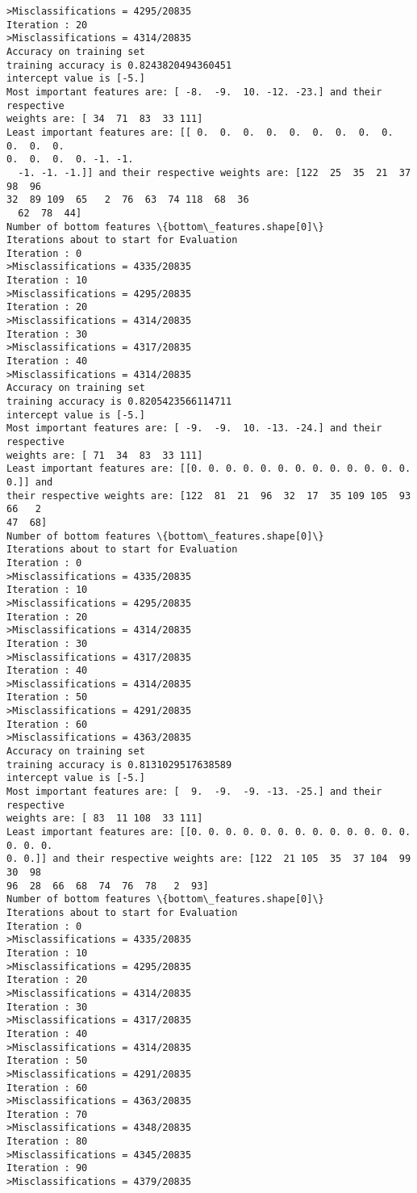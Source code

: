 \documentclass[11pt]{article}
\begin{document}
\begin{Verbatim}[commandchars=\\\{\}]
>Misclassifications = 4295/20835
Iteration : 20
>Misclassifications = 4314/20835
Accuracy on training set
training accuracy is 0.8243820494360451
intercept value is [-5.]
Most important features are: [ -8.  -9.  10. -12. -23.] and their respective
weights are: [ 34  71  83  33 111]
Least important features are: [[ 0.  0.  0.  0.  0.  0.  0.  0.  0.  0.  0.  0.
0.  0.  0.  0. -1. -1.
  -1. -1. -1.]] and their respective weights are: [122  25  35  21  37  98  96
32  89 109  65   2  76  63  74 118  68  36
  62  78  44]
Number of bottom features \{bottom\_features.shape[0]\}
Iterations about to start for Evaluation
Iteration : 0
>Misclassifications = 4335/20835
Iteration : 10
>Misclassifications = 4295/20835
Iteration : 20
>Misclassifications = 4314/20835
Iteration : 30
>Misclassifications = 4317/20835
Iteration : 40
>Misclassifications = 4314/20835
Accuracy on training set
training accuracy is 0.8205423566114711
intercept value is [-5.]
Most important features are: [ -9.  -9.  10. -13. -24.] and their respective
weights are: [ 71  34  83  33 111]
Least important features are: [[0. 0. 0. 0. 0. 0. 0. 0. 0. 0. 0. 0. 0. 0.]] and
their respective weights are: [122  81  21  96  32  17  35 109 105  93  66   2
47  68]
Number of bottom features \{bottom\_features.shape[0]\}
Iterations about to start for Evaluation
Iteration : 0
>Misclassifications = 4335/20835
Iteration : 10
>Misclassifications = 4295/20835
Iteration : 20
>Misclassifications = 4314/20835
Iteration : 30
>Misclassifications = 4317/20835
Iteration : 40
>Misclassifications = 4314/20835
Iteration : 50
>Misclassifications = 4291/20835
Iteration : 60
>Misclassifications = 4363/20835
Accuracy on training set
training accuracy is 0.8131029517638589
intercept value is [-5.]
Most important features are: [  9.  -9.  -9. -13. -25.] and their respective
weights are: [ 83  11 108  33 111]
Least important features are: [[0. 0. 0. 0. 0. 0. 0. 0. 0. 0. 0. 0. 0. 0. 0. 0.
0. 0.]] and their respective weights are: [122  21 105  35  37 104  99  30  98
96  28  66  68  74  76  78   2  93]
Number of bottom features \{bottom\_features.shape[0]\}
Iterations about to start for Evaluation
Iteration : 0
>Misclassifications = 4335/20835
Iteration : 10
>Misclassifications = 4295/20835
Iteration : 20
>Misclassifications = 4314/20835
Iteration : 30
>Misclassifications = 4317/20835
Iteration : 40
>Misclassifications = 4314/20835
Iteration : 50
>Misclassifications = 4291/20835
Iteration : 60
>Misclassifications = 4363/20835
Iteration : 70
>Misclassifications = 4348/20835
Iteration : 80
>Misclassifications = 4345/20835
Iteration : 90
>Misclassifications = 4379/20835

\end{Verbatim}
\end{document}
